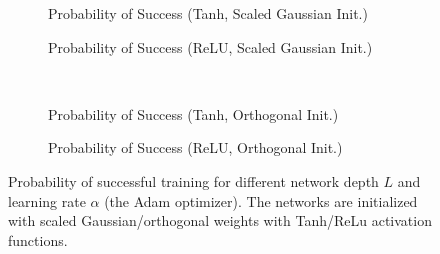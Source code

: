 \begin{figure}[h]
\centering
\newcommand{\myWidth}{0.4\textwidth}
\newcommand{\myspace}{\hspace{3mm}}
\begin{subfigure}{\myWidth}
  \centering
  \caption{Probability of Success (Tanh, Scaled Gaussian Init.)}
  \label{fig:mnist_adam_s1}
\end{subfigure}\myspace%
\begin{subfigure}{\myWidth}
  \centering
  \caption{Probability of Success (ReLU, Scaled Gaussian Init.)}
  \label{fig:mnist_adam_s2}
\end{subfigure}\myspace
\begin{subfigure}{8mm}
\end{subfigure}%
\\
\begin{subfigure}{\myWidth}
  \centering
  \caption{Probability of Success (Tanh, Orthogonal Init.)}
  \label{fig:mnist_adam_s3}
\end{subfigure}\myspace
\begin{subfigure}{\myWidth}
  \centering
  \caption{Probability of Success (ReLU, Orthogonal Init.)}
  \label{fig:mnist_adam_s4}
\end{subfigure}\myspace
\begin{subfigure}{8mm}
\end{subfigure}%
\caption[Probability of successful training for the Adam optimizer.]
{Probability of successful training for different network depth $L$ and learning rate $\alpha$ (the Adam optimizer). The networks are initialized with scaled Gaussian/orthogonal weights with Tanh/ReLu activation functions.
}
\label{fig:mnist_adam}
\end{figure}
